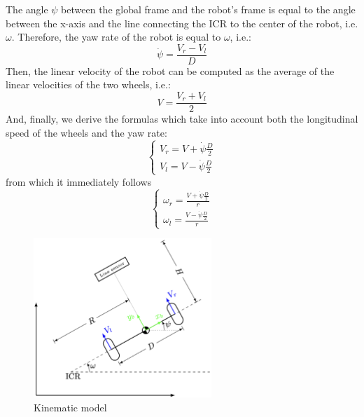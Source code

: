 The angle $\psi$ between the global frame and the robot's frame is equal to the angle between the x-axis and the line connecting the ICR to the center of the robot, i.e. $\omega$.
Therefore, the yaw rate of the robot is equal to $\omega$, i.e.:
\begin{equation}
    \dot{\psi} = \frac{V_r - V_l}{D}
\end{equation}
Then, the linear velocity of the robot can be computed as the average of the linear velocities of the two wheels, i.e.:
\begin{equation}
    V = \frac{V_r + V_l}{2}
\end{equation}
And, finally, we derive the formulas which take into account both the longitudinal speed of the wheels and the yaw rate:
\begin{equation}
\begin{cases}
    V_r = V + \dot{\psi} \frac{D}{2} \\
    V_l = V - \dot{\psi} \frac{D}{2}
\end{cases}
\end{equation}
from which it immediately follows
\begin{equation}
\begin{cases}
    \omega_r = \frac{V + \dot{\psi} \frac{D}{2}}{r} \\
    \omega_l = \frac{V - \dot{\psi} \frac{D}{2}}{r}
\end{cases}
\end{equation}
\begin{figure} [H]
    \centering
    \includegraphics[width=0.6\textwidth]{figures/kinematic_model.png}
    \caption{Kinematic model}
    \label{fig:kinematic_model}
\end{figure}
